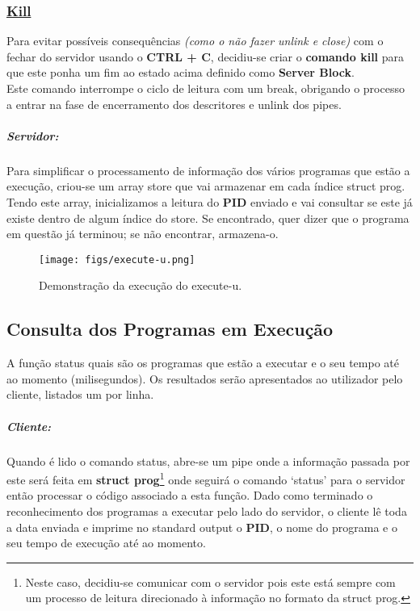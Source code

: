 \documentclass{report}
\begin{document}
\subsubsection{\underline{Kill}}
Para evitar possíveis consequências \textit{(como o não fazer unlink e close)} com o fechar do servidor usando o \textbf{CTRL + C}, decidiu-se criar o \textbf{comando kill} para que este ponha um fim ao estado acima definido como \textbf{Server Block}.\\
Este comando interrompe o ciclo de leitura com um break, obrigando o processo a entrar na fase de encerramento dos descritores e unlink dos pipes.

\subparagraph{Servidor:}

Para simplificar o processamento de informação dos vários programas que estão a execução, criou-se um array store que vai armazenar em cada índice struct prog. Tendo este array, inicializamos a leitura do \textbf{PID} enviado e vai consultar se este já existe dentro de algum índice do store. Se encontrado, quer dizer que o programa em questão já terminou; se não encontrar, armazena-o.\\ 

\begin{figure}[h]
    \centering
    \texttt{[image: figs/execute-u.png]}
    \caption{Demonstração da execução do execute-u.}
    \label{f}
\end{figure}

\subsection{Consulta dos Programas em Execução}
A função status quais são os programas que estão a executar e o seu tempo até ao momento (milisegundos). Os resultados serão apresentados ao utilizador pelo cliente, listados um por linha.

\subparagraph{Cliente:}

Quando é lido o comando status, abre-se um pipe onde a informação passada por este será feita em \textbf{struct prog}\footnote{Neste caso, decidiu-se comunicar com o servidor pois este está sempre com um processo de leitura direcionado à informação no formato da struct prog.} onde seguirá o comando ‘status’ para o servidor então processar o código associado a esta função. Dado como terminado o reconhecimento dos programas a executar pelo lado do servidor, o cliente lê toda a data enviada e imprime no standard output o \textbf{PID}, o nome do programa e o seu tempo de execução até ao momento.
\end{document}
